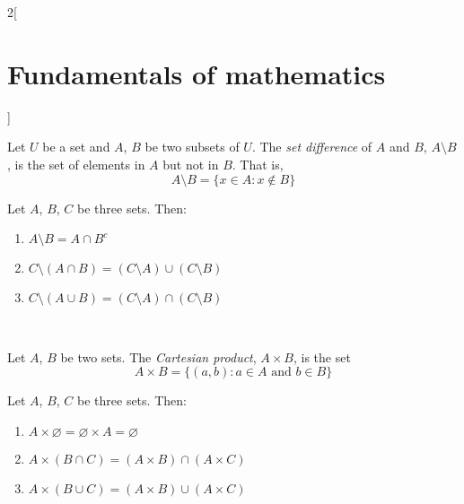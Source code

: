 \documentclass[../../../main_math.tex]{subfiles}
\begin{document}
\begin{multicols}{2}[\section{Fundamentals of mathematics}]
\begin{definition}
    Let $U$ be a set and $A$, $B$ be two subsets of $U$. The \emph{set difference} of $A$ and $B$, $A\setminus B$, is the set of elements in $A$ but not in $B$. That is, $$A\setminus B=\{x\in A:x\notin B\}$$
  \end{definition}
  \begin{proposition}
    Let $A$, $B$, $C$ be three sets. Then:
    \begin{enumerate}
      \item $A\setminus B=A\cap B^c$
      \item $C\setminus(A\cap B)=(C\setminus A)\cup (C\setminus B)$
      \item $C\setminus(A\cup B)=(C\setminus A)\cap (C\setminus B)$
    \end{enumerate}
  \end{proposition}
  \begin{center}
    \hfill
    \\
    \vspace{0.02\linewidth}
    \hfill
    
  \end{center}
  \begin{definition}
    Let $A$, $B$ be two sets. The \emph{Cartesian product}, $A\times B$, is the set $$A\times B=\{(a,b): a\in A\text{ and }b\in B\}$$
  \end{definition}
  \begin{proposition}
    Let $A$, $B$, $C$ be three sets. Then:
    \begin{enumerate}
      \item $A\times \varnothing=\varnothing\times A=\varnothing$
      \item $A\times(B\cap C)=(A\times B)\cap(A\times C)$
      \item $A\times(B\cup C)=(A\times B)\cup(A\times C)$
    \end{enumerate}
  \end{proposition}

\end{multicols}
\end{document}
